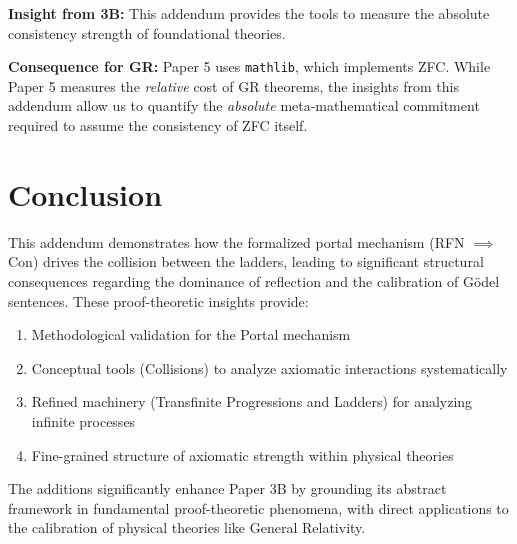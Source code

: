 \documentclass[11pt]{article}
\begin{document}
\textbf{Insight from 3B:} This addendum provides the tools to measure the absolute consistency strength of foundational theories.

\textbf{Consequence for GR:} Paper 5 uses \texttt{mathlib}, which implements ZFC. While Paper 5 measures the \emph{relative} cost of GR theorems, the insights from this addendum allow us to quantify the \emph{absolute} meta-mathematical commitment required to assume the consistency of ZFC itself.

\section{Conclusion}

This addendum demonstrates how the formalized portal mechanism (RFN $\implies$ Con) drives the collision between the ladders, leading to significant structural consequences regarding the dominance of reflection and the calibration of Gödel sentences. These proof-theoretic insights provide:

\begin{enumerate}
\item Methodological validation for the Portal mechanism
\item Conceptual tools (Collisions) to analyze axiomatic interactions systematically
\item Refined machinery (Transfinite Progressions and Ladders) for analyzing infinite processes
\item Fine-grained structure of axiomatic strength within physical theories
\end{enumerate}

The additions significantly enhance Paper 3B by grounding its abstract framework in fundamental proof-theoretic phenomena, with direct applications to the calibration of physical theories like General Relativity.
\end{document}
